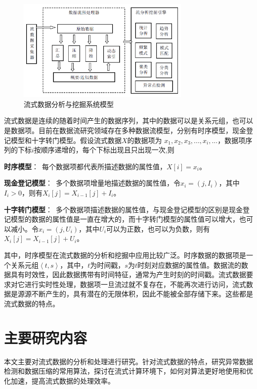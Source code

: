\begin{figure}
	\centering
	\includegraphics[width=0.75\textwidth]{figures/figure1x1}
	\caption{流式数据分析与挖掘系统模型}\label{fig:fig1}
\end{figure}

流式数据是连续的随着时间产生的数据序列，其中的数据可以是关系元组，也可以是数据项。目前在数据流研究领域存在多种数据流模型，分别有时序模型，现金登记模型和十字转门模型。假设流式数据$X$的数据项为 ${x}_{1},{x}_{2},{x}_{3}, ..., {x}_{i}, ...$，数据项序列的下标$i$按顺序递增的，每个下标出现且只出现一次,则

\textbf{时序模型}：\ 每个数据项都代表所描述数据的属性值，$X[i] = {x}_{i}$。

\textbf{现金登记模型}：\ 多个数据项增量地描述数据的属性值，令${x}_{i} = \left(j,{I}_{i} \right)$，其中${I}_{i} > 0$，则有${X}_{i}[j] = {X}_{i-1}[j] + {I}_{i}$。

\textbf{十字转门模型}：\ 多个数据项描述数据的属性值，与现金登记模型的区别是现金登记模型的数据的属性值是一直在增大的，而十字转门模型的属性值可以增大，也可以减小。令${x}_{i} = \left(j,{U}_{i} \right)$，其中${U}_{i}$可以为正数，也可以为负数，则有${X}_{i}[j] = {X}_{i-1}[j] + {U}_{i}$。

其中，时序模型在流式数据的分析和挖掘中应用比较广泛。时序数据的数据项是一个关系元组$\left \langle t,s \right \rangle$，其中，$t$为时间戳，$s$为$t$时刻对应数据的属性值。数据流的数据具有时效性，因此数据携带有时间特征，通常为产生时刻的时间戳。流式数据要求对它进行实时性处理，数据项一旦流过就不复存在，不能再次进行访问，流式数据是源源不断产生的，具有潜在的无限体积，因此不能被全部存储下来。这些都是流式数据的特点。

\section{主要研究内容}
本文主要对流式数据的分析和处理进行研究。针对流式数据的特点，研究异常数据检测和数据压缩的常用算法，探讨在流式计算环境下，如何对算法更好地使用和优化加速，提高流式数据的处理效率。

